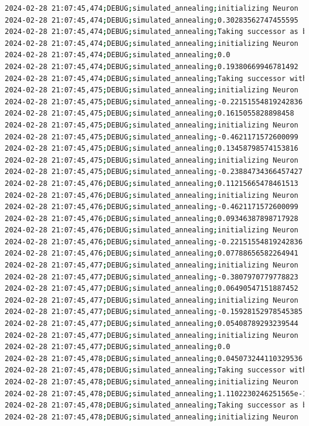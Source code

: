 \documentclass{article}
\begin{document}
\begin{lstlisting}[language=bash, caption=Example Output of Program]
2024-02-28 21:07:45,474;DEBUG;simulated_annealing;initializing Neuron
2024-02-28 21:07:45,474;DEBUG;simulated_annealing;0.30283562747455595
2024-02-28 21:07:45,474;DEBUG;simulated_annealing;Taking successor as better option (exploitation)
2024-02-28 21:07:45,474;DEBUG;simulated_annealing;initializing Neuron
2024-02-28 21:07:45,474;DEBUG;simulated_annealing;0.0
2024-02-28 21:07:45,474;DEBUG;simulated_annealing;0.19380669946781492
2024-02-28 21:07:45,474;DEBUG;simulated_annealing;Taking successor with probability 100% (exploration)
2024-02-28 21:07:45,475;DEBUG;simulated_annealing;initializing Neuron
2024-02-28 21:07:45,475;DEBUG;simulated_annealing;-0.22151554819242836
2024-02-28 21:07:45,475;DEBUG;simulated_annealing;0.1615055828898458
2024-02-28 21:07:45,475;DEBUG;simulated_annealing;initializing Neuron
2024-02-28 21:07:45,475;DEBUG;simulated_annealing;-0.4621171572600099
2024-02-28 21:07:45,475;DEBUG;simulated_annealing;0.13458798574153816
2024-02-28 21:07:45,475;DEBUG;simulated_annealing;initializing Neuron
2024-02-28 21:07:45,475;DEBUG;simulated_annealing;-0.23884734366457427
2024-02-28 21:07:45,476;DEBUG;simulated_annealing;0.11215665478461513
2024-02-28 21:07:45,476;DEBUG;simulated_annealing;initializing Neuron
2024-02-28 21:07:45,476;DEBUG;simulated_annealing;-0.4621171572600099
2024-02-28 21:07:45,476;DEBUG;simulated_annealing;0.09346387898717928
2024-02-28 21:07:45,476;DEBUG;simulated_annealing;initializing Neuron
2024-02-28 21:07:45,476;DEBUG;simulated_annealing;-0.22151554819242836
2024-02-28 21:07:45,476;DEBUG;simulated_annealing;0.07788656582264941
2024-02-28 21:07:45,477;DEBUG;simulated_annealing;initializing Neuron
2024-02-28 21:07:45,477;DEBUG;simulated_annealing;-0.3807970779778823
2024-02-28 21:07:45,477;DEBUG;simulated_annealing;0.06490547151887452
2024-02-28 21:07:45,477;DEBUG;simulated_annealing;initializing Neuron
2024-02-28 21:07:45,477;DEBUG;simulated_annealing;-0.15928152978545385
2024-02-28 21:07:45,477;DEBUG;simulated_annealing;0.05408789293239544
2024-02-28 21:07:45,477;DEBUG;simulated_annealing;initializing Neuron
2024-02-28 21:07:45,477;DEBUG;simulated_annealing;0.0
2024-02-28 21:07:45,478;DEBUG;simulated_annealing;0.045073244110329536
2024-02-28 21:07:45,478;DEBUG;simulated_annealing;Taking successor with probability 100% (exploration)
2024-02-28 21:07:45,478;DEBUG;simulated_annealing;initializing Neuron
2024-02-28 21:07:45,478;DEBUG;simulated_annealing;1.1102230246251565e-16
2024-02-28 21:07:45,478;DEBUG;simulated_annealing;Taking successor as better option (exploitation)
2024-02-28 21:07:45,478;DEBUG;simulated_annealing;initializing Neuron

\end{lstlisting}
\end{document}
